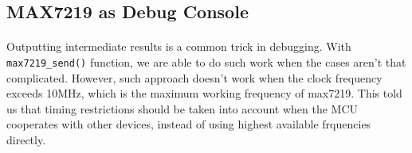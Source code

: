 \subsection{MAX7219 as Debug Console}
\paragraph{}
Outputting intermediate results is a common trick in debugging. 
With \texttt{max7219\_send()} function, we are able to do such work when the cases aren't that complicated.
However, such approach doesn't work when the clock frequency exceeds 10MHz, which is the maximum working frequency of max7219.
This told us that timing restrictions should be taken into account when the MCU cooperates with other devices, 
instead of using highest available frquencies directly.
